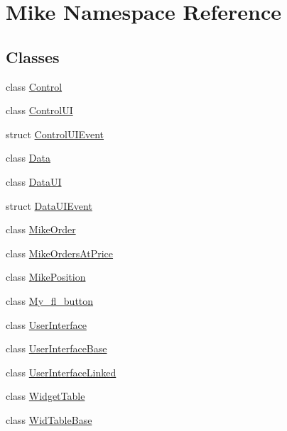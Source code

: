 \hypertarget{namespace_mike}{}\section{Mike Namespace Reference}
\label{namespace_mike}
\subsection*{Classes}
\begin{DoxyCompactItemize}
\item 
class \hyperlink{class_mike_1_1_control}{Control}
\item 
class \hyperlink{class_mike_1_1_control_u_i}{Control\+UI}
\item 
struct \hyperlink{struct_mike_1_1_control_u_i_event}{Control\+U\+I\+Event}
\item 
class \hyperlink{class_mike_1_1_data}{Data}
\item 
class \hyperlink{class_mike_1_1_data_u_i}{Data\+UI}
\item 
struct \hyperlink{struct_mike_1_1_data_u_i_event}{Data\+U\+I\+Event}
\item 
class \hyperlink{class_mike_1_1_mike_order}{Mike\+Order}
\item 
class \hyperlink{class_mike_1_1_mike_orders_at_price}{Mike\+Orders\+At\+Price}
\item 
class \hyperlink{class_mike_1_1_mike_position}{Mike\+Position}
\item 
class \hyperlink{class_mike_1_1_my__fl__button}{My\+\_\+fl\+\_\+button}
\item 
class \hyperlink{class_mike_1_1_user_interface}{User\+Interface}
\item 
class \hyperlink{class_mike_1_1_user_interface_base}{User\+Interface\+Base}
\item 
class \hyperlink{class_mike_1_1_user_interface_linked}{User\+Interface\+Linked}
\item 
class \hyperlink{class_mike_1_1_widget_table}{Widget\+Table}
\item 
class \hyperlink{class_mike_1_1_wid_table_base}{Wid\+Table\+Base}
\end{DoxyCompactItemize}
